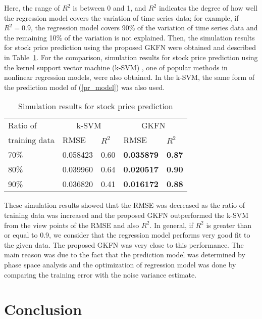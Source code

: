 \documentclass[runningheads,a4paper]{llncs}
\begin{document}
Here, the range of $R^2$ is between 0 and 1, and $R^2$ indicates the degree of how well the regression model
covers the variation of time series data; for example, if $R^2 = 0.9$, the regression model covers 90\% of
the variation of time series data and the remaining 10\% of the variation is not explained.
Then, the simulation results for stock price prediction using the proposed GKFN were obtained and described in Table~\ref{sim_res}.
For the comparison, simulation results for stock price prediction using the kernel support vector machine (k-SVM) \cite{svmlight},
one of popular methods in nonlinear regression models, were also obtained. In the k-SVM, the same form of
the prediction model of (\ref{pr_model}) was also used.

\begin{table}
\caption{Simulation results for stock price prediction}
\label{sim_res}
\centering
\begin{tabular}{||p{2cm}||p{1.6cm}|p{1.6cm}||p{1.6cm}|p{1.6cm}||}\hline
Ratio of        & \multicolumn{2}{c||}{k-SVM} & \multicolumn{2}{c||}{GKFN}\\ \cline{2-5}
training data & RMSE    & $R^2$ & RMSE             & $R^2$ \\ \hline
70\%          & 0.058423 & 0.60    & {\bf 0.035879} & {\bf 0.87} \\ \hline
80\%          & 0.039960 & 0.64    & {\bf 0.020517} & {\bf 0.90} \\ \hline
90\%          & 0.036820 & 0.41    & {\bf 0.016172} & {\bf 0.88} \\ \hline
\end{tabular}
\end{table}
These simulation results showed that the RMSE was decreased as the ratio of training data was increased and
the proposed GKFN outperformed the k-SVM from the view points of the RMSE and also $R^2$. In general, if
$R^2$ is greater than or equal to 0.9, we consider that the regression model performs very good fit to the given data.
The proposed GKFN was very close to this performance. The main reason was due to the fact that the prediction model
was determined by phase space analysis and the optimization of regression model was done by comparing
the training error with the noise variance estimate.

\section{Conclusion}
\end{document}
